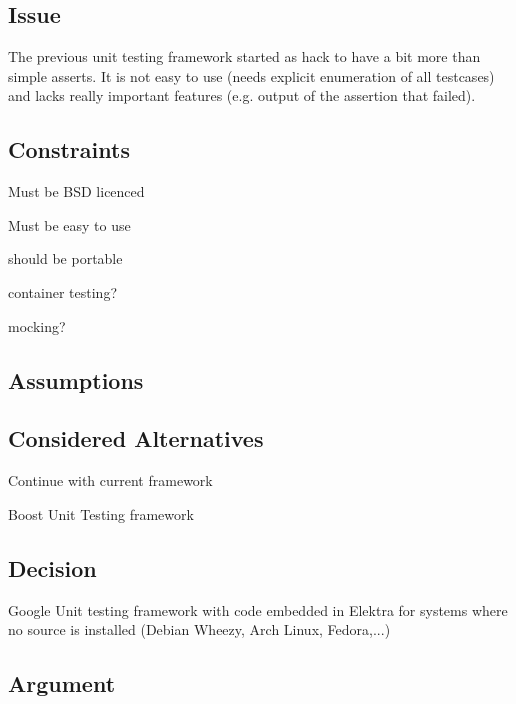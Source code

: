 \subsection*{Issue}

The previous unit testing framework started as hack to have a bit more than simple asserts. It is not easy to use (needs explicit enumeration of all testcases) and lacks really important features (e.\+g. output of the assertion that failed).

\subsection*{Constraints}


\begin{DoxyItemize}
\item Must be B\+S\+D licenced
\item Must be easy to use
\item should be portable
\item container testing?
\item mocking?
\end{DoxyItemize}

\subsection*{Assumptions}

\subsection*{Considered Alternatives}


\begin{DoxyItemize}
\item Continue with current framework
\item Boost Unit Testing framework
\end{DoxyItemize}

\subsection*{Decision}


\begin{DoxyItemize}
\item Google Unit testing framework with code embedded in Elektra for systems where no source is installed (Debian Wheezy, Arch Linux, Fedora,...)
\end{DoxyItemize}

\subsection*{Argument}


